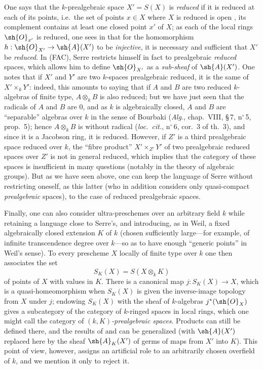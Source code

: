 \begin{env}[10.10.4]
\label{IV.10.10.4}
One says that the $k$-prealgebraic space $X'=S(X)$ is \emph{reduced} if it is reduced at each of its points, i.e.\ the set of points $x\in X$ where $X$ is reduced is open , its complement contains at least one closed point $x'$ of $X$; as each of the local rings $\sh{O}_{x'}$ is reduced, one sees in  that for the homomorphism $h:\sh{O}_{X'}\to\sh{A}(X')$ to be \emph{injective}, it is necessary and sufficient that $X'$ be \emph{reduced}.
In (FAC), Serre restricts himself in fact to prealgebraic \emph{reduced} spaces, which allows him to define $\sh{O}_{X'}$ as a \emph{sub-sheaf} of $\sh{A}(X')$.
One notes that if $X'$ and $Y'$ are two $k$-spaces prealgebraic reduced, it is the same of $X'\times_k Y'$: indeed, this amounts to saying that if $A$ and $B$ are two reduced $k$-algebras of finite type, $A\otimes_k B$ is also reduced; but we have just seen that the radicals of $A$ and $B$ are $0$, and as $k$ is algebraically closed, $A$ and $B$ are ``separable'' algebras over $k$ in the sense of Bourbaki (\emph{Alg.}, chap.~VIII, \S\,7, n$^\circ$\,5, prop.~5); hence $A\otimes_k B$ is without radical (\emph{loc.\ cit.}, n$^\circ$\,6, cor.~3 of th.~3), and since it is a Jacobson ring, it is reduced.
However, if $Z'$ is a third prealgebraic space reduced over $k$, the ``fibre product'' $X'\times_{Z'}Y'$ of two prealgebraic reduced spaces over $Z'$ is not in general reduced, which implies that the category of these spaces is insufficient in many questions (notably in the theory of algebraic groups).
But as we have seen above, one can keep the language of Serre without restricting oneself, as this latter (who in addition considers only quasi-compact \emph{prealgebraic} spaces), to the case of reduced prealgebraic spaces.
\end{env}


\begin{env}[10.10.5]
\label{IV.10.10.5}
Finally, one can also consider ultra-preschemes over an arbitrary field $k$ while
retaining a language close to Serre's, and introducing, as in Weil, a fixed
algebraically closed extension $K$ of $k$ (chosen sufficiently large---for example,
of infinite transcendence degree over $k$---so as to have enough ``generic points''
in Weil's sense).
To every prescheme $X$ locally of finite type over $k$ one then associates the set
\[
 S_K(X)=S(X\otimes_k K)
\]
of points of $X$ with values in $K$.
There is a canonical map $j:S_K(X)\to X$, which is a quasi-homeomorphism when
$S_K(X)$ is given the inverse-image topology from $X$ under $j$; endowing $S_K(X)$
with the sheaf of $k$-algebras $j^*(\sh{O}_X)$ gives a subcategory of the category
of $k$-ringed spaces in local rings, which one might call the category of
\emph{$(k,K)$-prealgebraic spaces}.
Products can still be defined there, and the results of  and
 can be generalized (with $\sh{A}(X')$ replaced here by the sheaf
$\sh{A}_K(X')$ of germs of maps from $X'$ into $K$).
This point of view, however, assigns an artificial role to an arbitrarily chosen
overfield of $k$, and we mention it only to reject it.
\end{env}
